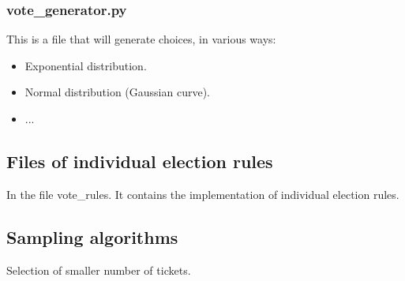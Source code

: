 \documentclass[a4paper,12pt]{report}
\begin{document}
	\subsubsection{vote\_generator.py}
	
	This is a file that will generate choices, in various ways:
	
	\begin{itemize}
		\item Exponential distribution.
		\item Normal distribution (Gaussian curve).
		\item ...
	\end{itemize}
	
	\subsection{Files of individual election rules}
	
	In the file vote\_rules. It contains the implementation of individual election rules.
	
	\subsection{Sampling algorithms}
	
	Selection of smaller number of tickets.
	
	
	
	
	
	
	
	
	
	
	
	
\end{document}
